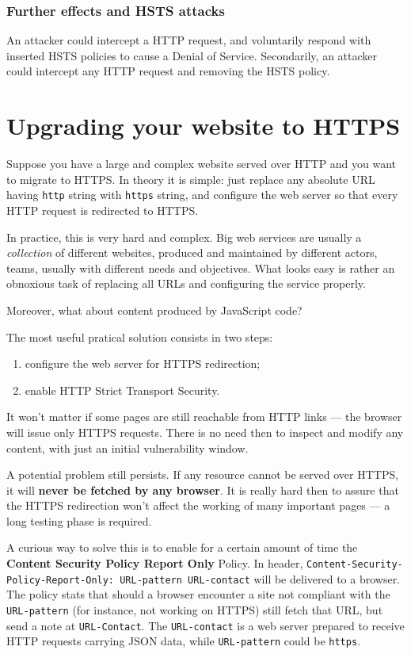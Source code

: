 \documentclass[10pt]{\classname}
\begin{document}
\subsubsection{Further effects and HSTS attacks}

An attacker could intercept a HTTP request, and voluntarily respond with
inserted HSTS policies to cause a Denial of Service. Secondarily, an attacker
could intercept any HTTP request and removing the HSTS policy.

\section{Upgrading your website to HTTPS}

Suppose you have a large and complex website served over HTTP and you want to
migrate to HTTPS. In theory it is simple: just replace any absolute URL having
\texttt{http} string with \texttt{https} string, and configure the web server
so that every HTTP request is redirected to HTTPS.

In practice, this is very hard and complex. Big web services are usually a
\emph{collection} of different websites, produced and maintained by different
actors, teams, usually with different needs and objectives. What looks easy is
rather an obnoxious task of replacing all URLs and configuring the service
properly.

Moreover, what about content produced by JavaScript code?

The most useful pratical solution consists in two steps:
\begin{enumerate}
    \item configure the web server for HTTPS redirection;
    \item enable HTTP Strict Transport Security.
\end{enumerate}

It won't matter if some pages are still reachable from HTTP links --- the
browser will issue only HTTPS requests. There is no need then to inspect and
modify any content, with just an initial vulnerability window.

A potential problem still persists. If any resource cannot be served over
HTTPS, it will \textbf{never be fetched by any browser}. It is really hard then
to assure that the HTTPS redirection won't affect the working of many important
pages --- a long testing phase is required.

A curious way to solve this is to enable for a certain amount of time the
\textbf{Content Security Policy Report Only} Policy. In header,
\texttt{Content\--Security\--Policy\--Report\--Only: URL\--pattern
URL\--contact} will be delivered to a browser. The policy stats that should a
browser encounter a site not compliant with the \texttt{URL-pattern} (for
instance, not working on HTTPS) still fetch that URL, but send a note at
\texttt{URL-Contact}. The \texttt{URL-contact} is a web server prepared to
receive HTTP requests carrying JSON data, while \texttt{URL\--pat\-tern} could be
\texttt{https}.
\end{document}
